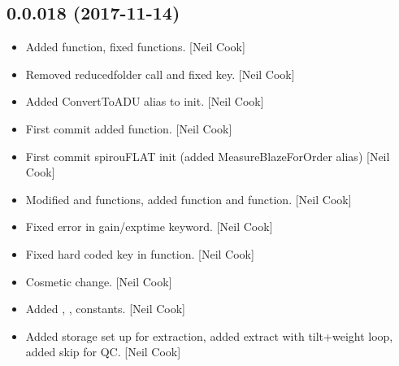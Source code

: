 \documentclass[a4paper,10pt,english]{report}
\begin{document}
\subsection{0.0.018 (2017-11-14)}
\label{\detokenize{misc/changelog:id532}}\begin{itemize}
\item {} 
Added  function, fixed 
functions. {[}Neil Cook{]}

\item {} 
Removed reducedfolder call and fixed  key. {[}Neil Cook{]}

\item {} 
Added ConvertToADU alias to init. {[}Neil Cook{]}

\item {} 
First commit  added  function.
{[}Neil Cook{]}

\item {} 
First commit spirouFLAT init (added MeasureBlazeForOrder alias) {[}Neil
Cook{]}

\item {} 
Modified  and  functions,
added  function and 
function. {[}Neil Cook{]}

\item {} 
Fixed error in gain/exptime keyword. {[}Neil Cook{]}

\item {} 
Fixed hard coded key in  function. {[}Neil Cook{]}

\item {} 
Cosmetic change. {[}Neil Cook{]}

\item {} 
Added , ,  constants. {[}Neil Cook{]}

\item {} 
Added storage set up for extraction, added extract with tilt+weight
loop, added skip for  QC. {[}Neil Cook{]}

\end{itemize}
\end{document}
